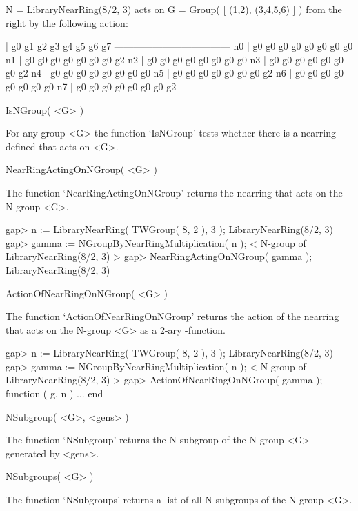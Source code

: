     N = LibraryNearRing(8/2, 3) acts on 
    G = Group( [ (1,2), (3,4,5,6) ] )
    from the right by the following action: 

          | g0  g1  g2  g3  g4  g5  g6  g7  
      ------------------------------------
      n0  | g0  g0  g0  g0  g0  g0  g0  g0  
      n1  | g0  g0  g0  g0  g0  g0  g0  g2  
      n2  | g0  g0  g0  g0  g0  g0  g0  g0  
      n3  | g0  g0  g0  g0  g0  g0  g0  g2  
      n4  | g0  g0  g0  g0  g0  g0  g0  g0  
      n5  | g0  g0  g0  g0  g0  g0  g0  g2  
      n6  | g0  g0  g0  g0  g0  g0  g0  g0  
      n7  | g0  g0  g0  g0  g0  g0  g0  g2  

\endexample



\>IsNGroup( <G> )

For any group <G> the function `IsNGroup' tests whether there is a nearring
defined that acts on <G>.

\>NearRingActingOnNGroup( <G> )

The function `NearRingActingOnNGroup' returns the nearring that acts on the
N-group <G>.

\beginexample
    gap> n := LibraryNearRing( TWGroup( 8, 2 ), 3 );
    LibraryNearRing(8/2, 3)
    gap> gamma := NGroupByNearRingMultiplication( n );
    < N-group of LibraryNearRing(8/2, 3) >
    gap> NearRingActingOnNGroup( gamma );                   
    LibraryNearRing(8/2, 3)
\endexample

\>ActionOfNearRingOnNGroup( <G> )

The function `ActionOfNearRingOnNGroup' returns the action of the nearring
that acts on the N-group <G> as a 2-ary \GAP-function.

\beginexample
    gap> n := LibraryNearRing( TWGroup( 8, 2 ), 3 );
    LibraryNearRing(8/2, 3)
    gap> gamma := NGroupByNearRingMultiplication( n );
    < N-group of LibraryNearRing(8/2, 3) >
    gap> ActionOfNearRingOnNGroup( gamma );
    function ( g, n ) ... end
\endexample



\>NSubgroup( <G>, <gens> )

The function `NSubgroup' returns the N-subgroup of the N-group <G>
generated by <gens>.

\>NSubgroups( <G> )

The function `NSubgroups' returns a list of all N-subgroups of the
N-group <G>.

